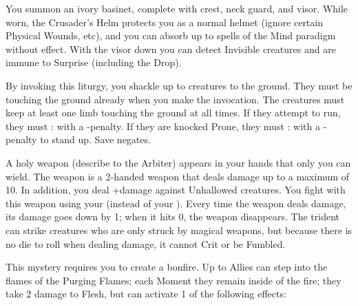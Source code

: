 {
\MYSTERY [
  Name = Crusader's Helm,
  Link = arcana-mystery-crusaders-helm,
  Paradigm = Force,
  Save = n/a,
  Duration = Session,
  Target = Self
]

You summon an ivory basinet, complete with crest, neck guard, and visor.  While worn, the Crusader's Helm protects you as a normal helmet (ignore certain Physical Wounds, etc), and you can absorb up to \DICE spells of the Mind paradigm without effect.  With the visor down you can detect Invisible creatures and are immune to Surprise (including the Drop).

\MYSTERY [
  Name = Grounding Mantra,
  Link = arcana-mystery-grounding-mantra,
  Paradigm = Elements,
  Save = Y (neg.),
  Duration = Markovian,
  Target = Close\, Nearby\, or Far-Away Target(s)
]

By invoking this liturgy, you shackle up to \DICE creatures to the ground.  They must be touching the ground already when you make the invocation.  The creatures must keep at least one limb touching the ground at all times.  If they attempt to run, they must \RB : \DEX with a -\DICE penalty.  If they are knocked Prone, they must \RB : \VIG with a -\DICE penalty to stand up.  Save negates.

\MYSTERY [
  Name = Holy Weapon,
  Link = arcana-mystery-holy-weapon,
  Paradigm = Force,
  Save = n/a,
  Duration = Session,
  Target = Self
]

A holy weapon (describe to the Arbiter) appears in your hands that only you can wield.  The weapon is a 2-handed weapon that deals \DICE damage up to a maximum of 10.  In addition, you deal +\DICE damage against Unhallowed creatures. You fight with this weapon using your \FOC (instead of your \VIG). Every time the weapon deals damage, its damage goes down by 1; when it hits 0, the weapon disappears.  The trident can strike creatures who are only struck by magical weapons, but because there is no die to roll when dealing damage, it cannot Crit or be Fumbled. 

\MYSTERY [
  Name = Purging Fire,
  Link = arcana-mystery-purging-fire,
  Paradigm = Elements,
  Save = N,
  Duration = \SUM Minutes,
  Target = See Below
]

This mystery requires you to create a bonfire.  Up to \DICE Allies can step into the flames of the Purging Flames; each Moment they remain inside of the fire; they take 2 damage to Flesh, but can activate 1 of the following effects:


}
